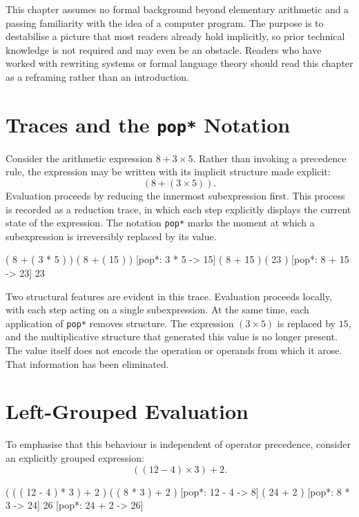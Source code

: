 \documentclass[12pt, oneside]{amsbook}
\theoremstyle{plain}
\theoremstyle{definition}
\theoremstyle{remark}
\begin{document}
This chapter assumes no formal background beyond elementary arithmetic and a passing familiarity with the idea of a computer program. The purpose is to destabilise a picture that most readers already hold implicitly, so prior technical knowledge is not required and may even be an obstacle. Readers who have worked with rewriting systems or formal language theory should read this chapter as a reframing rather than an introduction.

\section{Traces and the \texttt{pop*} Notation}
\label{sec:visible:traces}

Consider the arithmetic expression $8 + 3 \times 5$. Rather than invoking a
precedence rule, the expression may be written with its implicit structure made
explicit:
\[
  (8 + (3 \times 5)).
\]
Evaluation proceeds by reducing the innermost subexpression first. This process
is recorded as a reduction trace, in which each step explicitly displays the
current state of the expression. The notation \texttt{pop*} marks the moment at
which a subexpression is irreversibly replaced by its value.

\begin{tcolorbox}[reduction, title={Reduction trace: $8 + 3 \times 5$}]
( 8 + ( 3 * 5 ) )
( 8 + ( 15 ) )       [pop*: 3 * 5 -> 15]
( 8 + 15 )
( 23 )               [pop*: 8 + 15 -> 23]
23
\end{tcolorbox}

Two structural features are evident in this trace. Evaluation proceeds locally,
with each step acting on a single subexpression. At the same time, each
application of \texttt{pop*} removes structure. The expression $(3 \times 5)$
is replaced by $15$, and the multiplicative structure that generated this value
is no longer present. The value itself does not encode the operation or operands
from which it arose. That information has been eliminated.

\section{Left-Grouped Evaluation}
\label{sec:visible:leftgrouped}

To emphasise that this behaviour is independent of operator precedence,
consider an explicitly grouped expression:
\[
  ((12 - 4) \times 3) + 2.
\]

\begin{tcolorbox}[reduction, title={Reduction trace: $(12-4)\times 3+2$}]
( ( ( 12 - 4 ) * 3 ) + 2 )
( ( 8 * 3 ) + 2 )            [pop*: 12 - 4 -> 8]
( 24 + 2 )                   [pop*: 8 * 3 -> 24]
26                           [pop*: 24 + 2 -> 26]
\end{tcolorbox}
\end{document}

